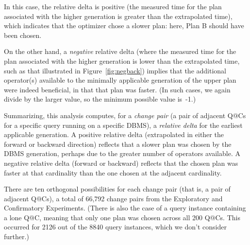 \documentclass[prodmode,acmtods]{acmsmall}
\begin{document}
In this case, the relative delta is positive (the measured time for the plan
associated with the higher generation is greater than the extrapolated
time), which indicates that the optimizer chose a slower plan: here,
Plan B should have been chosen.  

On the other hand, a {\em negative} relative delta (where the measured
time for the plan associated with the higher generation is lower than the
extrapolated time, such as that illustrated in Figure~\ref{fig:negback})
implies that the additional operator(s) available to the minimally
applicable generation of the upper plan were indeed beneficial, in that that
plan was faster. (In such cases, we again divide by the larger
value, so the minimum possible value is~-1.)

Summarizing, this analysis computes, for a {\em change pair} (a pair of
adjacent Q@Cs for a specific query running on a specific DBMS), a {\em
  relative delta} for the earliest applicable generation. A
positive relative delta (extrapolated in either the forward or backward
direction) reflects that a slower
plan was chosen by the \hbox{DBMS} generation, perhaps due to the greater number of
operators available. A negative relative delta (forward or backward) reflects
that the chosen plan was faster at that cardinality than the one
chosen at the adjacent cardinality.

There are ten orthogonal possibilities for each change pair (that
is, a pair of adjacent Q@Cs), a total of 66,792 change
pairs from the Exploratory and Confirmatory Experiments. (There is also the
case of a query instance containing a lone Q@C, meaning that only one plan was
chosen across all 200 Q@Cs. This occurred for 2126 out of the 8840
query instances, which we don't consider further.)
\end{document}

